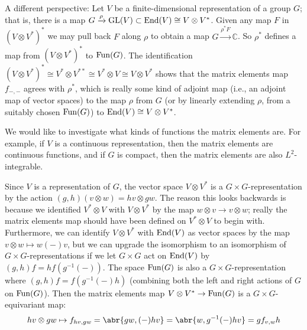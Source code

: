 \documentclass[../../rtnotes.tex]{subfiles}
\begin{document}
A different perspective: Let $V$ be a finite-dimensional representation of a group $G$; that is, there is a map $G\xrightarrow{\rho}\operatorname{GL}(V)\subset \operatorname{End}(V)\cong V\otimes V^\ast$. Given any map $F$ in $(V\otimes V^\ast)^\ast$ we may pull back $F$ along $\rho$ to obtain a map $G\xrightarrow{\rho^\ast F}\mathbb C$. So $\rho^\ast$ defines a map from $(V\otimes V^\ast)^\ast$ to $\operatorname{Fun}(G)$. The identification $(V\otimes V^\ast)^\ast\cong V^\ast\otimes V^{\ast\ast}\cong V^\ast\otimes V\cong V\otimes V^\ast$ shows that the matrix elements map $f_{-,-}$ agrees with $\rho^\ast$, which is really some kind of adjoint map (i.e., an adjoint map of vector spaces) to the map $\rho$ from $G$ (or by linearly extending $\rho$, from a suitably chosen $\operatorname{Fun}(G)$) to $\operatorname{End}(V)\cong V\otimes V^\ast$.

We would like to investigate what kinds of functions the matrix elements are. For example, if $V$ is a continuous representation, then the matrix elements are continuous functions, and if $G$ is compact, then the matrix elements are also $L^2$-integrable. 

Since $V$ is a representation of $G$, the vector space $V\otimes V^\ast$ is a $G\times G$-representation by the action $(g,h)(v\otimes w) = hv\otimes gw$. The reason this looks backwards is because we identified $V^\ast\otimes V$ with $V\otimes V^\ast$ by the map $w\otimes v\to v\otimes w$; really the matrix elements map should have been defined on $V^\ast\otimes V$ to begin with. Furthermore, we can identify $V\otimes V^\ast$ with $\operatorname{End}(V)$ as vector spaces by the map $v\otimes w\mapsto w(-)v$, but we can upgrade the isomorphism to an isomorphism of $G\times G$-representations if we let $G\times G$ act on $\operatorname{End}(V)$ by $(g,h)f = hf(g^{-1}(-))$. The space $\operatorname{Fun}(G)$ is also a $G\times G$-representation where $(g,h)f = f(g^{-1}(-)h)$ (combining both the left and right actions of $G$ on $\operatorname{Fun}(G)$). Then the matrix elements map $V\otimes V^\ast\to \operatorname{Fun}(G)$ is a $G\times G$-equivariant map:
\[hv\otimes gw\mapsto f_{hv,gw} = \abr{gw,(-)hv} = \abr{w,g^{-1}(-)hv} = gf_{v,w}h\]
\end{document}
